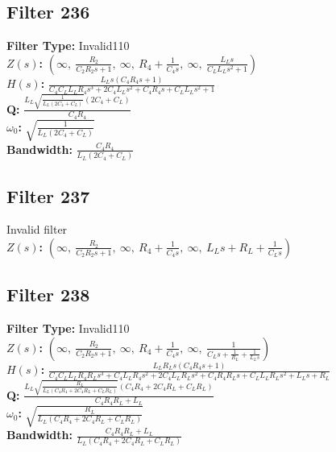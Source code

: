 \documentclass{article}
\begin{document}
\subsection*{Filter 236}
\textbf{Filter Type:} Invalid110 \\ 
\textbf{$Z(s)$:} $\left( \infty, \  \frac{R_{2}}{C_{2} R_{2} s + 1}, \  \infty, \  R_{4} + \frac{1}{C_{4} s}, \  \infty, \  \frac{L_{L} s}{C_{L} L_{L} s^{2} + 1}\right)$ \\ 
\textbf{$H(s)$:} $\frac{L_{L} s \left(C_{4} R_{4} s + 1\right)}{C_{4} C_{L} L_{L} R_{4} s^{3} + 2 C_{4} L_{L} s^{2} + C_{4} R_{4} s + C_{L} L_{L} s^{2} + 1}$ \\ 
\textbf{Q:} $\frac{L_{L} \sqrt{\frac{1}{L_{L} \left(2 C_{4} + C_{L}\right)}} \left(2 C_{4} + C_{L}\right)}{C_{4} R_{4}}$ \\ 
\textbf{$\omega_0$:} $\sqrt{\frac{1}{L_{L} \left(2 C_{4} + C_{L}\right)}}$ \\ 
\textbf{Bandwidth:} $\frac{C_{4} R_{4}}{L_{L} \left(2 C_{4} + C_{L}\right)}$ \\ 
\subsection*{Filter 237}
Invalid filter \\ 
\textbf{$Z(s)$:} $\left( \infty, \  \frac{R_{2}}{C_{2} R_{2} s + 1}, \  \infty, \  R_{4} + \frac{1}{C_{4} s}, \  \infty, \  L_{L} s + R_{L} + \frac{1}{C_{L} s}\right)$ \\ 
\subsection*{Filter 238}
\textbf{Filter Type:} Invalid110 \\ 
\textbf{$Z(s)$:} $\left( \infty, \  \frac{R_{2}}{C_{2} R_{2} s + 1}, \  \infty, \  R_{4} + \frac{1}{C_{4} s}, \  \infty, \  \frac{1}{C_{L} s + \frac{1}{R_{L}} + \frac{1}{L_{L} s}}\right)$ \\ 
\textbf{$H(s)$:} $\frac{L_{L} R_{L} s \left(C_{4} R_{4} s + 1\right)}{C_{4} C_{L} L_{L} R_{4} R_{L} s^{3} + C_{4} L_{L} R_{4} s^{2} + 2 C_{4} L_{L} R_{L} s^{2} + C_{4} R_{4} R_{L} s + C_{L} L_{L} R_{L} s^{2} + L_{L} s + R_{L}}$ \\ 
\textbf{Q:} $\frac{L_{L} \sqrt{\frac{R_{L}}{L_{L} \left(C_{4} R_{4} + 2 C_{4} R_{L} + C_{L} R_{L}\right)}} \left(C_{4} R_{4} + 2 C_{4} R_{L} + C_{L} R_{L}\right)}{C_{4} R_{4} R_{L} + L_{L}}$ \\ 
\textbf{$\omega_0$:} $\sqrt{\frac{R_{L}}{L_{L} \left(C_{4} R_{4} + 2 C_{4} R_{L} + C_{L} R_{L}\right)}}$ \\ 
\textbf{Bandwidth:} $\frac{C_{4} R_{4} R_{L} + L_{L}}{L_{L} \left(C_{4} R_{4} + 2 C_{4} R_{L} + C_{L} R_{L}\right)}$ \\ 
\end{document}
